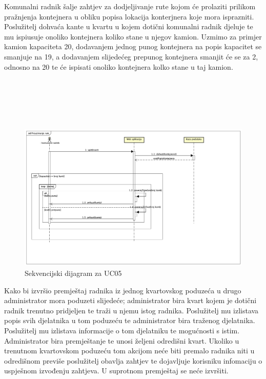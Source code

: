 				
				
				
				
				Komunalni radnik šalje zahtjev za dodjeljivanje rute kojom će prolaziti prilikom pražnjenja kontejnera u obliku popisa lokacija konterjnera koje mora isprazniti. Poslužitelj dohvaća kante u kvartu u kojem dotični komunalni radnik djeluje te mu ispiusuje onoliko kontejnera koliko stane u njegov kamion. Uzmimo za primjer kamion kapaciteta 20, dodavanjem jednog punog kontejnera na popis kapacitet se smanjuje na 19, a dodavanjem slijedećeg prepunog kontejnera smanjit će se za 2, odnosno na 20 te će ispisati onoliko kontejnera kolko stane u taj kamion.\\\\\\\\\\\\
				
				\begin{figure}[H]
					\includegraphics[scale=0.4]{figures/pravo_Preuzimanje_rute.PNG}
					\centering
					\caption{Sekvencijski dijagram za UC05}
					\label{fig:sekv-uc05}
				\end{figure}
			
							
								
				
				
				
				
				
				
				Kako bi izvršio premještaj radnika iz jednog kvartovskog poduzeća u drugo administrator mora poduzeti slijedeće; administrator bira kvart kojem je dotični radnik trenutno pridjeljen te traži u njemu istog radnika. Poslužitelj mu izlistava popis svih djelatnika u tom poduzeću te administrator bira traženog djelatnika. Poslužitelj mu izlistava informacije o tom djelatniku te mogućnosti s istim. Administrator bira premještanje te unosi željeni odredišni kvart. Ukoliko u trenutnom kvartovskom poduzeću tom akcijom neće biti premalo radnika niti u odredišnom previše poslužitelj obavlja zahtjev te dojavljuje korisniku infomaciju o uspješnom izvođenju zahtjeva. U suprotnom premještaj se neće izvršiti. \\\\
				
